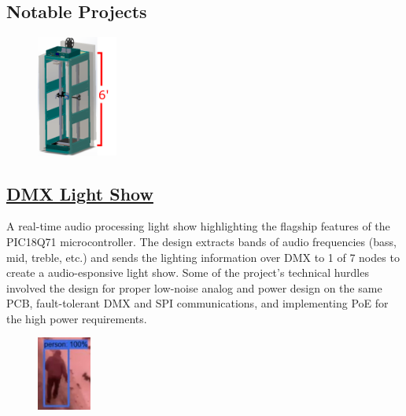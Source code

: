 \documentclass[
	10pt, %
]{FreemanCV}
\begin{document}
\begin{paracol}{2}

\vspace*{-20pt}
\section{Notable Projects}

\setlength\intextsep{7pt} %
\begin{figure} %
	\hspace*{-23pt} %
    \includegraphics[width=75pt]{printer} %
\end{figure}

\vspace*{-10pt} %
\leavevmode\subsection{\href{https://github.com/jfcbooth/3dpp}{DMX Light Show \scriptsize\faLink}}

A real-time audio processing light show highlighting the flagship features of the PIC18Q71 microcontroller.
The design extracts bands of audio frequencies (bass, mid, treble, etc.) and sends the lighting information over DMX to 1 of 7 nodes to create a audio-esponsive light show.
Some of the project's technical hurdles involved the design for proper low-noise analog and power design on the same PCB, fault-tolerant DMX and SPI communications, and implementing PoE for the high power requirements.



\setlength\intextsep{20pt} %
\begin{figure} %
    \includegraphics[width=50pt]{security_system} %
\end{figure}


\end{paracol}
\end{document}

